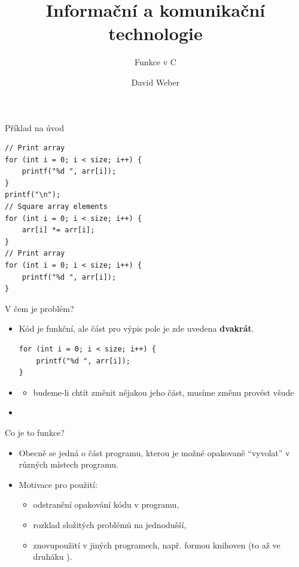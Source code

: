 \documentclass[14pt,aspectratio=169]{beamer}
\title{Informační a komunikační technologie}
\subtitle{Funkce v C}
\author{David Weber}
\begin{document}

    \begin{frame}
        \titlepage
    \end{frame}

    \begin{frame}[t,fragile]{Příklad na úvod}
        \begin{lstlisting}
// Print array
for (int i = 0; i < size; i++) {
    printf("%d ", arr[i]);
}
printf("\n");
// Square array elements
for (int i = 0; i < size; i++) {
    arr[i] *= arr[i];
}
// Print array
for (int i = 0; i < size; i++) {
    printf("%d ", arr[i]);
}
        \end{lstlisting}
    \end{frame}

    \begin{frame}[t,fragile]{V čem je problém?}
        \begin{itemize}
            \item Kód je funkční, ale část pro výpis pole je zde uvedena \textbf{dvakrát}.
            \begin{lstlisting}
for (int i = 0; i < size; i++) {
    printf("%d ", arr[i]);
}
            \end{lstlisting}
            \item {} \xmark
            \begin{itemize}
                \item budeme-li chtít změnit nějakou jeho část, musíme změnu provést všude
            \end{itemize}
            \item {} \cmark
        \end{itemize}
    \end{frame}

    \begin{frame}[t]{Co je to funkce?}
        \begin{itemize}
            \item Obecně se jedná o část programu, kterou je možné opakovaně ``vyvolat'' v různých místech programu.
            \item Motivace pro použití:
            \begin{itemize}
                \item odstranění opakování kódu v programu,
                \item rozklad složitých problémů na jednodušší,
                \item znovupoužití v jiných programech, např. formou knihoven (to až ve druháku ).
            \end{itemize}
        \end{itemize}
    \end{frame}
\end{document}

